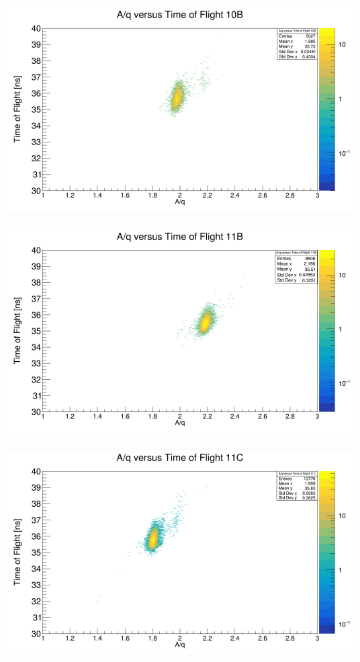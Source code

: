 \documentclass[12pt, letterpaper]{article}
\begin{document}
\begin{figure}[!htbp]
\begin{subfigure}{.5\textwidth}
  \centering
  \includegraphics[width=.9\linewidth]{aq_tof10b.png}  
  \caption{}
  \label{fig:sub-first}
\end{subfigure}
\begin{subfigure}{.5\textwidth}
  \centering
  \includegraphics[width=.9\linewidth]{aq_tof11b.png} 
  \caption{}
  \label{fig:sub-second}
\end{subfigure}
\begin{subfigure}{.5\textwidth}
  \centering
  \includegraphics[width=.9\linewidth]{aq_tof11c.png} 

\end{subfigure}
\end{figure}
\end{document}
